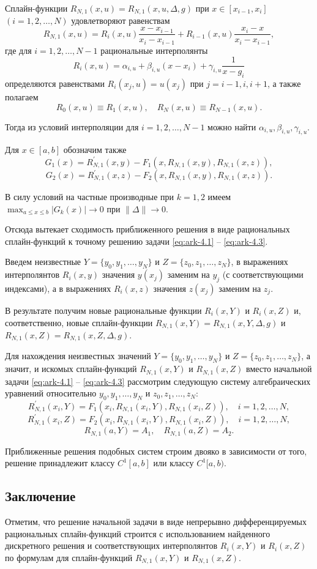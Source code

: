 Сплайн-функции $R_{N,1}(x,u)=R_{N,1}(x,u,\Delta,g)$ при $x\in [x_{i-1}, x_i]$ 
$(i=1,2,\dots,N)$ удовлетворяют равенствам
$$
R_{N,1}(x,u)=R_i(x,u) \frac{x-x_{i-1}}{x_i-x_{i-1}}+
R_{i-1}(x,u)\frac{x_i-x}{x_i-x_{i-1}},
$$
где для $i=1,2,\dots,N-1$ рациональные интерполянты 
$$
R_i(x,u)=\alpha_{i,u}+\beta_{i,u} (x-x_i)+\gamma_{i,u} \frac 1{x-g_i}
$$
определяются равенствами $R_i(x_j,u)=u(x_j)$  при $j=i-1, i, i+1$, а также полагаем  
$$
R_0(x,u)\equiv R_1(x,u),\quad R_N(x,u)\equiv R_{N-1}(x,u).
$$

Тогда из условий интерполяции для $i=1,2,\dots, N-1$ можно найти 
$\alpha_{i,u}, \beta_{i,u}, \gamma_{i,u}$. 

Для $x\in[a,b]$ обозначим также 
$$
G_1(x)=R_{N,1}^\prime(x,y)-F_1(x, R_{N,1}(x,y),R_{N,1}(x,z)),
$$
$$
G_2(x)=R_{N,1}^\prime(x,z)-F_2(x, R_{N,1}(x,y),R_{N,1}(x,z)).
$$

В силу условий на частные производные при $k=1,2$ имеем
$\max_{a\leqslant x \leqslant b} |G_k(x)|\to 0$ при $\|\Delta\| \to 0$.

Отсюда вытекает сходимость приближенного решения в виде рациональных 
сплайн-функций к точному решению задачи \eqref{eq:ark-4.1} -- \eqref{eq:ark-4.3}.

Введем неизвестные $Y=\{y_0,y_1, \dots,y_N\}$  и $Z=\{z_0,z_1, \dots, z_N\}$,
 в выражениях интерполянтов $R_i(x,y)$ значения $y(x_j)$ заменим на $y_j$
  (с соответствующими индексами), а в выражениях $R_i(x,z)$ значения $z(x_j)$
  заменим на $z_j$.

В результате получим новые рациональные функции $R_i(x,Y)$ и $R_i(x, Z)$ и, 
соответственно, новые сплайн-функции $R_{N,1}(x,Y)=R_{N,1}(x,Y, \Delta,g)$
 и $R_{N,1} (x,Z)=R_{N,1}(x,Z,\Delta, g)$.

Для нахождения неизвестных значений $Y=\{y_0,y_1, \dots,y_N\}$ и 
$Z=\{z_0,z_1, \dots, z_N\}$, а значит, и искомых сплайн-функций $R_{N,1}(x,Y)$
 и $R_{N,1}(x,Z)$  вместо начальной задачи \eqref{eq:ark-4.1} -- \eqref{eq:ark-4.3}
 рассмотрим следующую систему алгебраических уравнений относительно 
 $y_0,y_1, \dots,y_N$ и $z_0,z_1, \dots, z_N$: 
$$
R_{N,1}^\prime(x_i,Y)=F_1(x_i, R_{N,1}(x_i,Y),R_{N,1}(x_i,Z)),\quad i=1,2,\dots,N,
$$
$$
R_{N,1}^\prime(x_i,Z)=F_2(x_i, R_{N,1}(x_i,Y),R_{N,1}(x_i,Z)),\quad i=1,2,\dots,N,
$$
$$
R_{N,1}(a,Y)=A_1,\quad R_{N,1}(a,Z)=A_2.
$$

Приближенные решения подобных систем строим двояко в зависимости от того, решение 
принадлежит классу $C^1[a,b]$  или классу $C^1[a,b)$.

\subsection{ Заключение} 
Отметим, что решение начальной задачи в виде непрерывно дифференцируемых рациональных 
сплайн-функций строится с использованием найденного дискретного решения и соответствующих 
интерполянтов $R_i(x,Y)$ и $R_i(x, Z)$ по формулам для сплайн-функций $R_{N,1}(x,Y)$
 и $R_{N,1}(x,Z)$.


